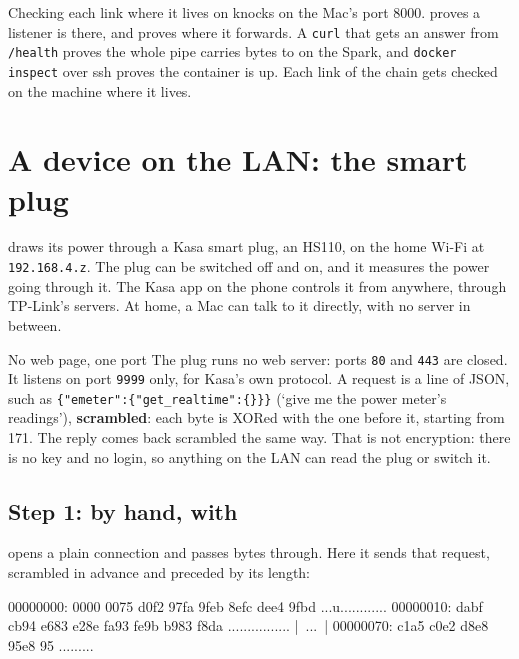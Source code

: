 \documentclass[11pt,a4paper]{article}
\renewcommand{\panetitle}{Shared pane 5.2, logged in to \name{AlfSPARK}}
\begin{document}
\begin{result}{Checking each link where it lives}
 on  knocks on the Mac's port 8000.  proves a listener is there, and  proves where it forwards. A \texttt{curl} that gets an answer from \texttt{/health} proves the whole pipe carries bytes to  on the Spark, and \texttt{docker inspect} over ssh proves the container is up. Each link of the chain gets checked on the machine where it lives.
\end{result}

\section{A device on the LAN: the smart plug}

 draws its power through a Kasa smart plug, an HS110, on the home Wi-Fi at \texttt{192.168.4.z}. The plug can be switched off and on, and it measures the power going through it. The Kasa app on the phone controls it from anywhere, through TP-Link's servers. At home, a Mac can talk to it directly, with no server in between.

\begin{insight}{No web page, one port}
The plug runs no web server: ports \texttt{80} and \texttt{443} are closed. It listens on port \texttt{9999} only, for Kasa's own protocol. A request is a line of JSON, such as \texttt{\{"emeter":\{"get\_realtime":\{\}\}\}} (‘give me the power meter's readings’), \textbf{scrambled}: each byte is XORed with the one before it, starting from 171. The reply comes back scrambled the same way. That is not encryption: there is no key and no login, so anything on the LAN can read the plug or switch it.
\end{insight}

\subsection*{Step 1: by hand, with }

 opens a plain connection and passes bytes through. Here it sends that request, scrambled in advance and preceded by its length:

\renewcommand{\panetitle}{Shared pane 5.2, on \name{AlfMAC5}}
\begin{cmdout}
00000000: 0000 0075 d0f2 97fa 9feb 8efc dee4 9fbd  ...u............
00000010: dabf cb94 e683 e28e fa93 fe9b b983 f8da  ................
|~...~|
00000070: c1a5 c0e2 d8e8 95e8 95                   .........
\end{cmdout}
\end{document}

